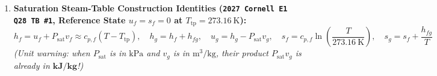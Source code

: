 \begin{formulacard}
\begin{enumerate}
  \item \textbf{Saturation Steam-Table Construction Identities (\texttt{2027 Cornell E1 Q28 TB \#1}, Reference State $u_f = s_f = 0$ at $T_{\mathrm{tp}} = \SI{273.16}{\kelvin}$):}
  \begin{equation}\label{eq:08:steam-table-build}
    h_f = u_f + P_{\mathrm{sat}}v_f \approx c_{p,f}(T - T_{\mathrm{tp}}), \quad h_g = h_f + h_{fg}, \quad \boxed{u_g = h_g - P_{\mathrm{sat}}v_g}, \quad \boxed{s_f = c_{p,f}\ln\left(\frac{T}{\SI{273.16}{\kelvin}}\right)}, \quad \boxed{s_g = s_f + \frac{h_{fg}}{T}}
  \end{equation}
  \emph{(Unit warning: when $P_{\mathrm{sat}}$ is in $\si{\kilo\pascal}$ and $v_g$ is in $\si{\cubic\meter\per\kilogram}$, their product $P_{\mathrm{sat}}v_g$ is already in $\mathbf{\si{\kilo\joule\per\kilogram}}$!)}
\end{enumerate}
\end{formulacard}

